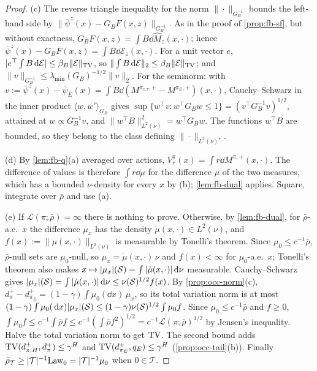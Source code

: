 \begin{proof}
(c) The reverse triangle inequality for the norm $\|\cdot\|_{G_B^{-1}}$ bounds the left-hand side by $\|\bar\psi^{z}(x)-G_BF(x,z)\|_{G_B^{-1}}$.
As in the proof of \cref{prop:fb-sf}, but without exactness, $G_BF(x,z)=\int B\dd\hat M_z(x,\cdot)$; hence $\bar\psi^{z}(x)-G_BF(x,z)=\int B\dd\mathcal E_z(x,\cdot)$.
For a unit vector $e$, $|e^\top\int B\,\mathrm{d}\mathcal E|\le\beta_B\|\mathcal E\|_{\mathrm{TV}}$, so $\|\int B\,\mathrm{d}\mathcal E\|_2\le\beta_B\|\mathcal E\|_{\mathrm{TV}}$; and $\|v\|_{G_B^{-1}}\le\lambda_{\min}(G_B)^{-1/2}\|v\|_2$.
For the seminorm: with $v:=\bar\psi^{z}(x)-\bar\psi_E(x)=\int B\dd(M^{\pi_{z,\tau},+}-M^{\pi_E,+})(x,\cdot)$, Cauchy--Schwarz in the inner product $\langle w,w'\rangle_{G_B}$ gives $\sup\{w^\top v:w^\top G_Bw\le1\}=(v^\top G_B^{-1}v)^{1/2}$, attained at $w\propto G_B^{-1}v$, and $\|w^\top B\|^2_{L^2(\nu)}=w^\top G_Bw$. The functions $w^\top B$ are bounded, so they belong to the class defining $\|\cdot\|_{L^2(\nu)^\star}$.

(d) By \cref{lem:fb-q}(a) averaged over actions, $V^\pi_r(x)=\int r\dd M^{\pi,+}(x,\cdot)$. The difference of values is therefore $\int r\dd\mu$ for the difference $\mu$ of the two measures, which has a bounded $\nu$-density for every $x$ by (b); \cref{lem:fb-dual} applies. Square, integrate over $\bar\rho$ and use (a).

(e) If $\mathcal L(\pi;\bar\rho)=\infty$ there is nothing to prove. Otherwise, by \cref{lem:fb-dual}, for $\bar\rho$-a.e.\ $x$ the difference $\mu_x$ has the density $\dot\mu(x,\cdot)\in L^2(\nu)$, and $f(x):=\|\dot\mu(x,\cdot)\|_{L^2(\nu)}$ is measurable by Tonelli's theorem.
Since $\mu_0\le c^{-1}\bar\rho$, $\bar\rho$-null sets are $\mu_0$-null, so $\mu_x=\dot\mu(x,\cdot)\,\nu$ and $f(x)<\infty$ for $\mu_0$-a.e.\ $x$; Tonelli's theorem also makes $x\mapsto|\mu_x|(\mathcal{S})=\int|\dot\mu(x,\cdot)|\,\mathrm{d}\nu$ measurable.
Cauchy--Schwarz gives $|\mu_x|(\mathcal{S})=\int|\dot\mu(x,\cdot)|\,\mathrm{d}\nu\le\nu(\mathcal{S})^{1/2}f(x)$.
By \cref{prop:occ-norm}(c), $d^+_\pi-d^+_{\pi_E}=(1-\gamma)\int\mu_0(\dd x)\,\mu_x$, so its total variation norm is at most $(1-\gamma)\int\mu_0(\,\mathrm{d} x)|\mu_x|(\mathcal{S})\le(1-\gamma)\nu(\mathcal{S})^{1/2}\int\mu_0f$.
Since $\mu_0\le c^{-1}\bar\rho$ and $f\ge0$, $\int\mu_0f\le c^{-1}\int\bar\rho f\le c^{-1}(\int\bar\rho f^2)^{1/2}=c^{-1}\mathcal L(\pi;\bar\rho)^{1/2}$ by Jensen's inequality.
Halve the total variation norm to get $\mathrm{TV}$. The second bound adds $\mathrm{TV}(d^+_{\pi,H},d^+_\pi)\le\gamma^H$ and $\mathrm{TV}(d^+_{\pi_E},q_E)\le\gamma^H$ (\cref{prop:occ-tail}(b)).
Finally $\bar\rho_{\mathcal T}\ge|\mathcal T|^{-1}\mathrm{Law}_0=|\mathcal T|^{-1}\mu_0$ when $0\in\mathcal T$.
\end{proof}

